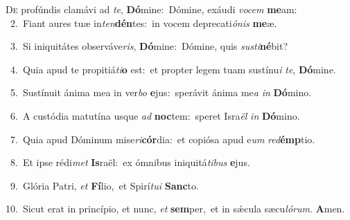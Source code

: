 \lettrine{\initial\textcolor{\initialcolor}{D}}{e} profúndis clamávi ad \textit{te}\-, \textbf{Dó}\-mine:~\star Dómine, exáudi \textit{vo}\-\textit{cem} \textbf{me}\-am:\\
{\numbfont\textcolor{\numbcolor}{~2.}}~Fiant aures tuæ in\-\textit{ten}\-\textbf{dén}tes:~\star in vocem deprecati\-\textit{ó}\-\textit{nis} \textbf{me}\-æ.\par
{\numbfont\textcolor{\numbcolor}{~3.}}~Si iniquitátes observáve\-\textit{ris}\-, \textbf{Dó}\-mine:~\star Dómine, quis \textit{sus}\-\textit{ti}\textbf{né}bit?\par
{\numbfont\textcolor{\numbcolor}{~4.}}~Quia apud te propitiá\-\textit{ti}\-\textbf{o} est:~\star et propter legem tuam sustínu\textit{i} \textit{te}\-, \textbf{Dó}\-mine.\par
{\numbfont\textcolor{\numbcolor}{~5.}}~Sustínuit ánima mea in ver\textit{bo} \textbf{e}\-jus:~\star sperávit ánima me\textit{a} \textit{in} \textbf{Dó}\-mino.\par
{\numbfont\textcolor{\numbcolor}{~6.}}~A custódia matutína usque \textit{ad} \textbf{noc}\-tem:~\star speret Isra\textit{ël} \textit{in} \textbf{Dó}\-mino.\par
{\numbfont\textcolor{\numbcolor}{~7.}}~Quia apud Dóminum mise\-\textit{ri}\-\textbf{cór}dia:~\star et copiósa apud e\textit{um} \textit{red}\-\textbf{émp}tio.\par
{\numbfont\textcolor{\numbcolor}{~8.}}~Et ipse rédi\textit{met} \textbf{Is}\-raël:~\star ex ómnibus iniquitá\-\textit{ti}\-\textit{bus} \textbf{e}\-jus.\par
{\numbfont\textcolor{\numbcolor}{~9.}}~Glória Patri, \textit{et} \textbf{Fí}\-lio,~\star et Spirí\-\textit{tu}\-\textit{i} \textbf{Sanc}\-to.\par
{\numbfont\textcolor{\numbcolor}{10.}}~Sicut erat in princípio, et nunc, \textit{et} \textbf{sem}\-per,~\star et in sǽcula sæcu\-\textit{ló}\-\textit{rum}. \textbf{A}\-men.\par
